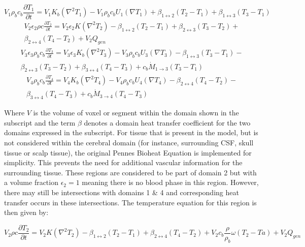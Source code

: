 \documentclass[11pt,english,a4paper,twoside,openright]{report}
\begin{document}
{{{{{{{{\begin{equation}
\label{Eq:Thermal1}
V_{1}\rho_{b}c_{b}\frac{\partial T_{1}}{\partial t}=V_{1}K_{b}(\nabla^{2}T_{1})-V_{1}\rho_{b}c_{b}U_{1}(\nabla T_{1})+\beta_{1\leftrightarrow2}(T_{2}-T_{1})+\beta_{1\leftrightarrow3}(T_{3}-T_{1})
\end{equation}
\begin{multline}
\label{Eq:Thermal2}
V_{2}\epsilon_{2}\rho c\frac{\partial T_{2}}{\partial t}=V_{2}\epsilon_{2} K(\nabla^{2}T_{2})-\beta_{1\leftrightarrow2}(T_{2}-T_{1})+\beta_{2\leftrightarrow3}(T_{3}-T_{2})+\\
\beta_{2\leftrightarrow4}(T_{4}-T_{2})+V_{2}Q_{gen}
\end{multline}
\begin{multline}
\label{Eq:Thermal3}
V_{3}\epsilon_{3}\rho_{b}c_{b}\frac{\partial T_{3}}{\partial t}=V_{3}\epsilon_{3}K_{b}(\nabla^{2}T_{3})-V_{3}\rho_{b}c_{b}U_{3}(\nabla T_{3})-\beta_{1\leftrightarrow3}(T_{3}-T_{1})-\\\beta_{2\leftrightarrow3}(T_{3}-T_{2})
+\beta_{3\leftrightarrow4}(T_{4}-T_{3})+c_{b}\dot{M}_{1\rightarrow3}(T_{3}-T_{1})
\end{multline}
\begin{multline}
\label{Eq:Thermal4}
V_{4}\rho_{b}c_{b}\frac{\partial T_{4}}{\partial t}=V_{4}K_{b}(\nabla^{2}T_{4})-V_{4}\rho_{b}c_{b}U_{4}(\nabla T_{4})-\beta_{2\leftrightarrow4}(T_{4}-T_{2})-\\
\beta_{3\leftrightarrow4}(T_{4}-T_{3})+c_{b}\dot{M}_{3\rightarrow4}(T_{4}-T_{3})
\end{multline}

Where $V$ is the volume of voxel or segment within the domain shown in the subscript and the term $\beta$ denotes a domain heat transfer coefficient for the two domains expressed in the subscript. For tissue that is present in the model, but is not considered within the cerebral domain (for instance, surrounding CSF, skull tissue or scalp tissue), the original Pennes Bioheat Equation is implemented for simplicity. This prevents the need for additional vascular information for the surrounding tissue. These regions are considered to be part of domain 2 but with a volume fraction $\epsilon_{2}=1$ meaning there is no blood phase in this region. However, there may still be intersections with domains 1 \& 4 and corresponding heat transfer occurs in these intersections. The temperature equation for this region is then given by:

\begin{equation}
\label{Eq:Thermal5}
V_{2}\rho c\frac{\partial T_{2}}{\partial t}=V_{2}K(\nabla^{2}T_{2})-\beta_{1\leftrightarrow2}(T_{2}-T_{1})+\beta_{2\leftrightarrow4}(T_{4}-T_{2})+V_{2}c_{b}\frac{\rho}{\rho_{b}}\omega(T_{2}-T{a})+V_{2}Q_{gen}
\end{equation}

}}}}}}}}
\end{document}
